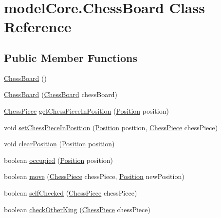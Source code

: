 \hypertarget{classmodel_core_1_1_chess_board}{\section{model\+Core.\+Chess\+Board Class Reference}
\label{classmodel_core_1_1_chess_board}
}
\subsection*{Public Member Functions}
\begin{DoxyCompactItemize}
\item 
\hyperlink{classmodel_core_1_1_chess_board_a50f1163eb1a59a7193668a8d1cf89435}{Chess\+Board} ()
\item 
\hyperlink{classmodel_core_1_1_chess_board_a74d33500fe30c1441989710578d9725d}{Chess\+Board} (\hyperlink{classmodel_core_1_1_chess_board}{Chess\+Board} chess\+Board)
\item 
\hyperlink{classmodel_chess_pieces_1_1_chess_piece}{Chess\+Piece} \hyperlink{classmodel_core_1_1_chess_board_ad700d180ac71927b8fd0e5c3e09ddd2b}{get\+Chess\+Piece\+In\+Position} (\hyperlink{classmodel_core_1_1_position}{Position} position)
\item 
void \hyperlink{classmodel_core_1_1_chess_board_af1a00d0d402bde8b8b5e5a23a96e6374}{set\+Chess\+Piece\+In\+Position} (\hyperlink{classmodel_core_1_1_position}{Position} position, \hyperlink{classmodel_chess_pieces_1_1_chess_piece}{Chess\+Piece} chess\+Piece)
\item 
void \hyperlink{classmodel_core_1_1_chess_board_a59800c1635a93d08909d34814bfffd20}{clear\+Position} (\hyperlink{classmodel_core_1_1_position}{Position} position)
\item 
boolean \hyperlink{classmodel_core_1_1_chess_board_abf420a5f1ea25fe7a8c6cdce3427c0af}{occupied} (\hyperlink{classmodel_core_1_1_position}{Position} position)
\item 
boolean \hyperlink{classmodel_core_1_1_chess_board_ab9216efa0fa5ce7794f813a500887647}{move} (\hyperlink{classmodel_chess_pieces_1_1_chess_piece}{Chess\+Piece} chess\+Piece, \hyperlink{classmodel_core_1_1_position}{Position} new\+Position)
\item 
boolean \hyperlink{classmodel_core_1_1_chess_board_aed20e0cd69a469134238b8ce28403e76}{self\+Checked} (\hyperlink{classmodel_chess_pieces_1_1_chess_piece}{Chess\+Piece} chess\+Piece)
\item 
boolean \hyperlink{classmodel_core_1_1_chess_board_a65d2495b5efc7db5a62e8af13ca0dda0}{check\+Other\+King} (\hyperlink{classmodel_chess_pieces_1_1_chess_piece}{Chess\+Piece} chess\+Piece)

\end{DoxyCompactItemize}

